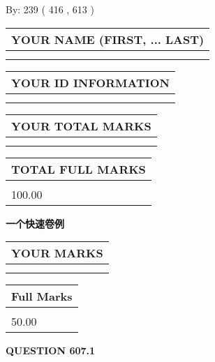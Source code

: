 \documentclass{ctexart}
\begin{document}
   
\hspace{1.0in} By: 
 239 ( 416 ,  613 )
   
   
   
   
\newpage 
\setcounter{page}{ 
   607001 } 
   
   
   
   
\noindent\begin{tabular}{|l|}
\hline
YOUR NAME (FIRST, ... LAST)  \\
\hline
 \\ 
 \\ 
\hline
\end{tabular}
\hspace{0.05in} \begin{tabular}{|l|}
\hline
 YOUR   ID   INFORMATION  \\
\hline
 \\ 
 \\ 
\hline
\end{tabular}
   
   
\vspace{0.2in}\noindent\begin{tabular}{|l|}
\hline
YOUR TOTAL MARKS  \\
\hline
 \\ 
 \\ 
\hline
\end{tabular}
\hspace{0.05in} \begin{tabular}{|l|}
\hline
TOTAL FULL MARKS  \\
\hline
 \\ 
100.00 \\
\hline
\end{tabular}
   
   
 \vspace{0.2in}
{\LARGE {\textbf{ 一个快速卷例}}}
   
   
  
\vspace{0.2in}
  
\noindent\begin{tabular}{|l|}
\hline
 YOUR MARKS  \\
\hline
 \\ 
 \\ 
\hline
\end{tabular}
\hspace{0.05in} \begin{tabular}{|l|}
\hline
 Full Marks  \\
\hline
 \\ 
50.00 \\
\hline
\end{tabular}
{\textbf{\Large{QUESTION
607.1 
}}}
  
\end{document}
